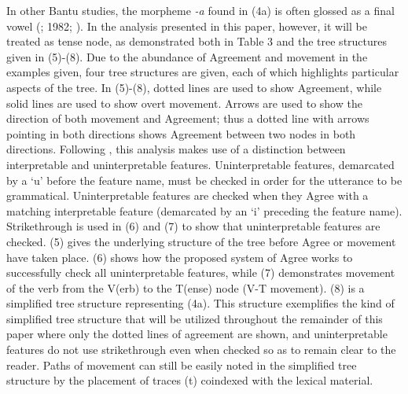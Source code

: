 \documentclass[output=paper]{langsci/langscibook}
\begin{document}
In other Bantu studies, the morpheme \textit{-a} found in (4a) is often glossed as a final vowel (\citealt{Khumalo1981}; 1982; \citealt{Sibanda2004}). In the analysis presented in this paper, however, it will be treated as tense node, as demonstrated both in Table 3 and the tree structures given in (5)-(8). Due to the abundance of Agreement and movement in the examples given, four tree structures are given, each of which highlights particular aspects of the tree. In (5)-(8), dotted lines are used to show Agreement, while solid lines are used to show overt movement. Arrows are used to show the direction of both movement and Agreement; thus a dotted line with arrows pointing in both directions shows Agreement between two nodes in both directions. Following \citet{Chomsky2001}, this analysis makes use of a distinction between interpretable and uninterpretable features. Uninterpretable features, demarcated by a `u' before the feature name, must be checked in order for the utterance to be grammatical. Uninterpretable features are checked when they Agree with a matching interpretable feature (demarcated by an `i' preceding the feature name). Strikethrough is used in (6) and (7) to show that uninterpretable features are checked. (5)  gives the underlying structure of the tree before Agree or movement have taken place. (6) shows how the proposed system of Agree works to successfully check all uninterpretable features, while (7) demonstrates movement of the verb from the V(erb) to the T(ense) node (V-T movement). (8) is a simplified tree structure representing (4a). This structure exemplifies the kind of simplified tree structure that will be utilized throughout the remainder of this paper where only the dotted lines of agreement are shown, and uninterpretable features do not use strikethrough even when checked so as to remain clear to the reader. Paths of movement can still be easily noted in the simplified tree structure by the placement of traces (t) coindexed with the lexical material.

 
\end{document}
